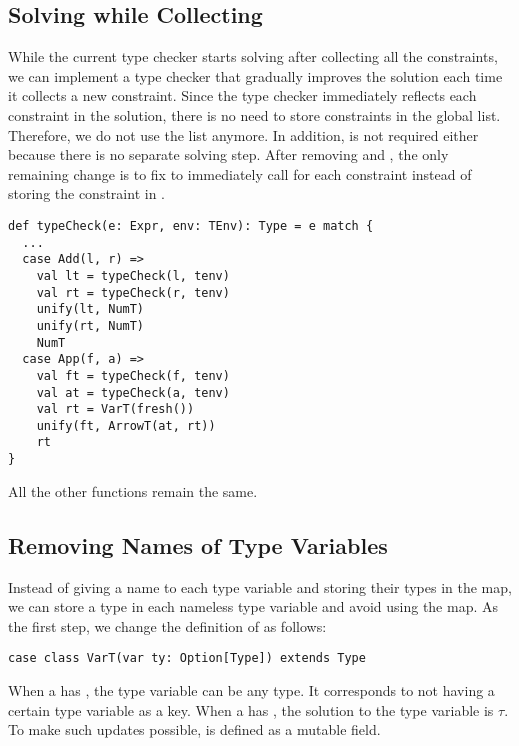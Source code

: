 \subsection{Solving while Collecting}

While the current type checker starts solving after collecting all the
constraints, we can implement a type checker that gradually improves the
solution each time it collects a new constraint. Since the type checker
immediately reflects each constraint in the solution, there is no need to store
constraints in the global list. Therefore, we do not use the 
list anymore. In addition,  is not required either because there is
no separate solving step. After removing  and ,
the only remaining change is to fix  to immediately call
 for each constraint instead of storing the constraint in
.

\begin{verbatim}
def typeCheck(e: Expr, env: TEnv): Type = e match {
  ...
  case Add(l, r) =>
    val lt = typeCheck(l, tenv)
    val rt = typeCheck(r, tenv)
    unify(lt, NumT)
    unify(rt, NumT)
    NumT
  case App(f, a) =>
    val ft = typeCheck(f, tenv)
    val at = typeCheck(a, tenv)
    val rt = VarT(fresh())
    unify(ft, ArrowT(at, rt))
    rt
}
\end{verbatim}

All the other functions remain the same.

\subsection{Removing Names of Type Variables}

Instead of giving a name to each type variable and storing their types in the
 map, we can store a type in each nameless type variable and
avoid using the map. As the first step, we change the definition of 
as follows:

\begin{verbatim}
case class VarT(var ty: Option[Type]) extends Type
\end{verbatim}

When a  has , the type variable can be any type. It
corresponds to  not having a certain type variable as a key.
When a  has , the solution to the type variable is
$\tau$. To make such updates possible,  is defined as a mutable field.

